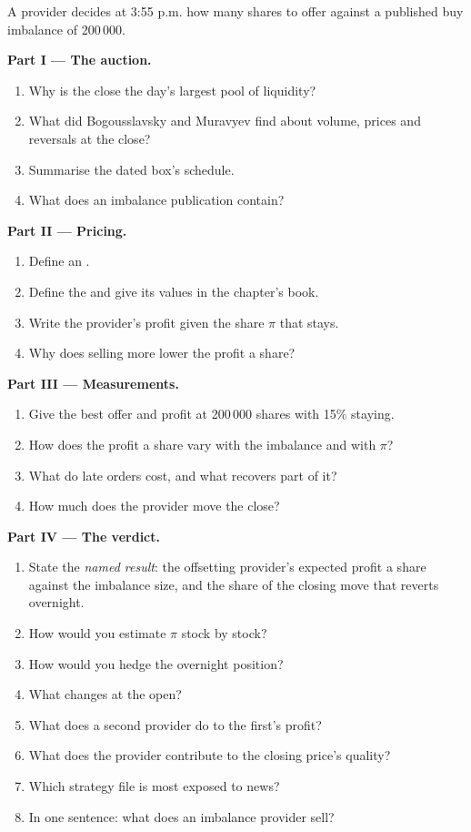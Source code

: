 \begin{problem}\label{pb:hf:auctions-and-the-close:1}
A provider decides at 3:55 p.m. how many shares to offer against a published buy imbalance of 200\,000.

\medskip\noindent\textbf{Part I --- The auction.}
\begin{enumerate}
\item Why is the close the day's largest pool of liquidity?
\item What did Bogousslavsky and Muravyev find about volume, prices and reversals at the close?
\item Summarise the dated box's schedule.
\item What does an imbalance publication contain?
\end{enumerate}

\medskip\noindent\textbf{Part II --- Pricing.}
\begin{enumerate}[resume]
\item Define an .
\item Define the  and give its values in the chapter's book.
\item Write the provider's profit given the share $\pi$ that stays.
\item Why does selling more lower the profit a share?
\end{enumerate}

\medskip\noindent\textbf{Part III --- Measurements.}
\begin{enumerate}[resume]
\item Give the best offer and profit at 200\,000 shares with 15\% staying.
\item How does the profit a share vary with the imbalance and with $\pi$?
\item What do late orders cost, and what recovers part of it?
\item How much does the provider move the close?
\end{enumerate}

\medskip\noindent\textbf{Part IV --- The verdict.}
\begin{enumerate}[resume]
\item State the \emph{named result}: the offsetting provider's expected profit a share against the imbalance size, and the share of the closing
move that reverts overnight.
\item How would you estimate $\pi$ stock by stock?
\item How would you hedge the overnight position?
\item What changes at the open?
\item What does a second provider do to the first's profit?
\item What does the provider contribute to the closing price's quality?
\item Which strategy file is most exposed to news?
\item In one sentence: what does an imbalance provider sell?
\end{enumerate}
\end{problem}

